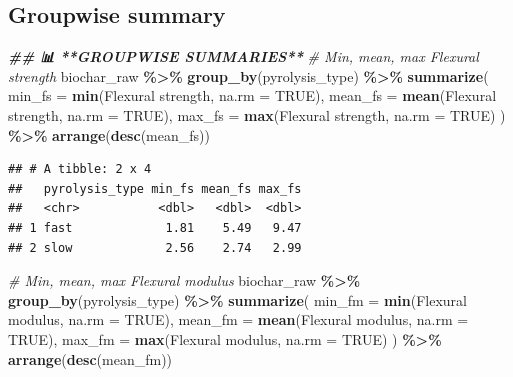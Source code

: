 \documentclass[
]{article}
\newenvironment{Shaded}{\begin{snugshade}}{\end{snugshade}}
\newcommand{\AttributeTok}[1]{\textcolor[rgb]{0.13,0.29,0.53}{#1}}
\newcommand{\CommentTok}[1]{\textcolor[rgb]{0.56,0.35,0.01}{\textit{#1}}}
\newcommand{\ConstantTok}[1]{\textcolor[rgb]{0.56,0.35,0.01}{#1}}
\newcommand{\DocumentationTok}[1]{\textcolor[rgb]{0.56,0.35,0.01}{\textbf{\textit{#1}}}}
\newcommand{\FunctionTok}[1]{\textcolor[rgb]{0.13,0.29,0.53}{\textbf{#1}}}
\newcommand{\NormalTok}[1]{#1}
\newcommand{\SpecialCharTok}[1]{\textcolor[rgb]{0.81,0.36,0.00}{\textbf{#1}}}
\newcommand{\StringTok}[1]{\textcolor[rgb]{0.31,0.60,0.02}{#1}}
\begin{document}
\subsection{Groupwise summary}\label{groupwise-summary}

\begin{Shaded}
\begin{Highlighting}[]
\DocumentationTok{\#\# 📊 **GROUPWISE SUMMARIES**}
\CommentTok{\# Min, mean, max Flexural strength}
\NormalTok{biochar\_raw }\SpecialCharTok{\%\textgreater{}\%} 
  \FunctionTok{group\_by}\NormalTok{(pyrolysis\_type) }\SpecialCharTok{\%\textgreater{}\%} 
  \FunctionTok{summarize}\NormalTok{(}
    \AttributeTok{min\_fs =} \FunctionTok{min}\NormalTok{(}\StringTok{\textasciigrave{}}\AttributeTok{Flexural strength}\StringTok{\textasciigrave{}}\NormalTok{, }\AttributeTok{na.rm =} \ConstantTok{TRUE}\NormalTok{),}
    \AttributeTok{mean\_fs =} \FunctionTok{mean}\NormalTok{(}\StringTok{\textasciigrave{}}\AttributeTok{Flexural strength}\StringTok{\textasciigrave{}}\NormalTok{, }\AttributeTok{na.rm =} \ConstantTok{TRUE}\NormalTok{),}
    \AttributeTok{max\_fs =} \FunctionTok{max}\NormalTok{(}\StringTok{\textasciigrave{}}\AttributeTok{Flexural strength}\StringTok{\textasciigrave{}}\NormalTok{, }\AttributeTok{na.rm =} \ConstantTok{TRUE}\NormalTok{)}
\NormalTok{  ) }\SpecialCharTok{\%\textgreater{}\%} 
  \FunctionTok{arrange}\NormalTok{(}\FunctionTok{desc}\NormalTok{(mean\_fs))}
\end{Highlighting}
\end{Shaded}

\begin{verbatim}
## # A tibble: 2 x 4
##   pyrolysis_type min_fs mean_fs max_fs
##   <chr>           <dbl>   <dbl>  <dbl>
## 1 fast             1.81    5.49   9.47
## 2 slow             2.56    2.74   2.99
\end{verbatim}

\begin{Shaded}
\begin{Highlighting}[]
\CommentTok{\# Min, mean, max Flexural modulus}
\NormalTok{biochar\_raw }\SpecialCharTok{\%\textgreater{}\%} 
  \FunctionTok{group\_by}\NormalTok{(pyrolysis\_type) }\SpecialCharTok{\%\textgreater{}\%} 
  \FunctionTok{summarize}\NormalTok{(}
    \AttributeTok{min\_fm =} \FunctionTok{min}\NormalTok{(}\StringTok{\textasciigrave{}}\AttributeTok{Flexural modulus}\StringTok{\textasciigrave{}}\NormalTok{, }\AttributeTok{na.rm =} \ConstantTok{TRUE}\NormalTok{),}
    \AttributeTok{mean\_fm =} \FunctionTok{mean}\NormalTok{(}\StringTok{\textasciigrave{}}\AttributeTok{Flexural modulus}\StringTok{\textasciigrave{}}\NormalTok{, }\AttributeTok{na.rm =} \ConstantTok{TRUE}\NormalTok{),}
    \AttributeTok{max\_fm =} \FunctionTok{max}\NormalTok{(}\StringTok{\textasciigrave{}}\AttributeTok{Flexural modulus}\StringTok{\textasciigrave{}}\NormalTok{, }\AttributeTok{na.rm =} \ConstantTok{TRUE}\NormalTok{)}
\NormalTok{  ) }\SpecialCharTok{\%\textgreater{}\%} 
  \FunctionTok{arrange}\NormalTok{(}\FunctionTok{desc}\NormalTok{(mean\_fm))}
\end{Highlighting}
\end{Shaded}
\end{document}
